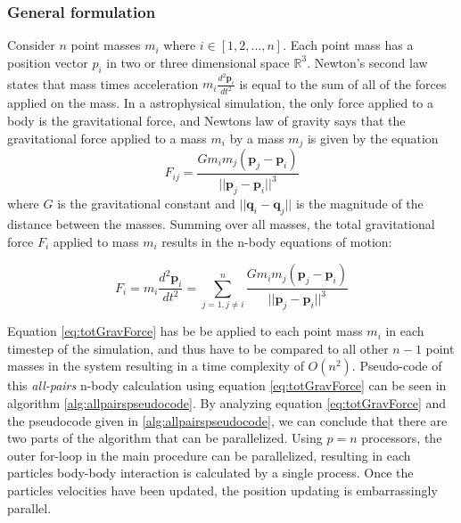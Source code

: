\subsubsection{General formulation}
Consider $n$ point masses $m_i$ where $i \in [1, 2,..., n]$. Each point mass has a position vector $p_i$ in two or three dimensional space $\mathbb{R}^3$. 
Newton's second law states that mass times acceleration $m_i \frac{d^2 \boldsymbol p_i}{dt^2}$ is equal to the sum of all of the forces applied on the mass. In a astrophysical simulation, the only force applied to a body is the gravitational force, and Newtons law of gravity says that the gravitational force applied to a mass $m_i$ by a mass $m_j$ is given by the equation
\begin{equation}
    F_{ij} = \frac{G m_i m_j (\boldsymbol p_j - \boldsymbol p_i)}{|| \boldsymbol p_j - \boldsymbol p_i|| ^3}
\end{equation}
\noindent where $G$ is the gravitational constant and $|| \boldsymbol q_i - \boldsymbol q_j||$ is the magnitude of the distance between the masses. Summing over all masses, the total gravitational force $F_i$ applied to mass $m_i$ results in the n-body equations of motion:
 
\begin{equation} \label{eq:totGravForce}
    F_i = m_i\frac{d^2 \boldsymbol p_i}{dt^2} = \sum_{j=1, j\neq i}^n \frac{G m_i m_j (\boldsymbol p_j - \boldsymbol p_i)}{|| \boldsymbol p_j - \boldsymbol p_i|| ^3}
\end{equation}

Equation \ref{eq:totGravForce} has be be applied to each point mass $m_i$ in each timestep of the simulation, and thus have to be compared to all other $n-1$ point masses in the system resulting in a time complexity of $O(n^2)$. Pseudo-code of this \textit{all-pairs} n-body calculation using equation \ref{eq:totGravForce} can be seen in algorithm \ref{alg:allpairspseudocode}. By analyzing equation \ref{eq:totGravForce} and the pseudocode given in \ref{alg:allpairspseudocode}, we can conclude that there are two parts of the algorithm that can be parallelized. Using $p=n$ processors, the outer for-loop in the main procedure can be parallelized, resulting in each particles body-body interaction is calculated by a single process. Once the particles velocities have been updated, the position updating is embarrassingly parallel.

